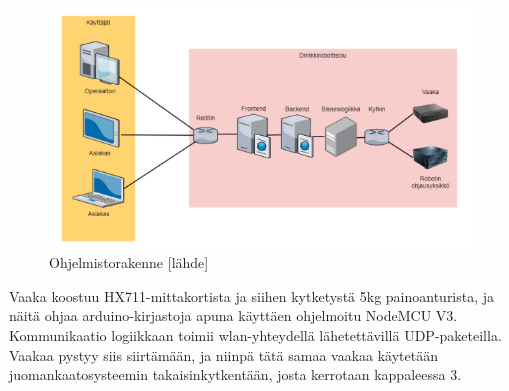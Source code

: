 \begin{figure}[h]
\begin{center}
\includegraphics{img/rakenne_lowres.png}
\end{center}
\caption{Ohjelmistorakenne [lähde]}
\label{fig:rakenne}
\end{figure}

Vaaka koostuu HX711-mittakortista ja siihen kytketystä 5kg painoanturista, ja näitä ohjaa arduino-kirjastoja apuna käyttäen ohjelmoitu NodeMCU V3. Kommunikaatio logiikkaan toimii wlan-yhteydellä lähetettävillä UDP-paketeilla. Vaakaa pystyy siis siirtämään, ja niinpä tätä samaa vaakaa käytetään juomankaatosysteemin takaisinkytkentään, josta kerrotaan kappaleessa 3.
